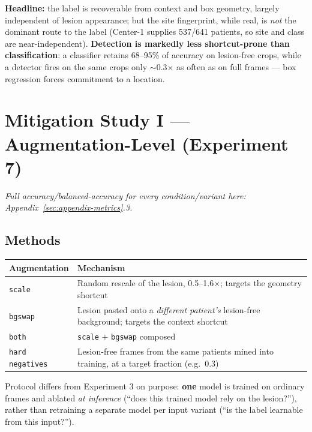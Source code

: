 \documentclass[10pt]{article}
\begin{document}
\textbf{Headline:} the label is recoverable from context and box geometry, largely independent of lesion
appearance; but the site fingerprint, while real, is \emph{not} the dominant route to the label (Center-1
supplies 537/641 patients, so site and class are near-independent). \textbf{Detection is markedly less
shortcut-prone than classification}: a classifier retains 68--95\% of accuracy on lesion-free crops, while a
detector fires on the same crops only $\sim$0.3$\times$ as often as on full frames --- box regression forces
commitment to a location.

\clearpage
\section{Mitigation Study I --- Augmentation-Level (Experiment 7)}
\label{sec:mit1}

\noindent\textit{Full accuracy/balanced-accuracy for every condition/variant here: Appendix~\ref{sec:appendix-metrics}.3.}

\subsection{Methods}

\begin{center}
\begin{tabular}{lL{9.5cm}}
\toprule
\textbf{Augmentation} & \textbf{Mechanism} \\
\midrule
\texttt{scale} & Random rescale of the lesion, 0.5--1.6$\times$; targets the geometry shortcut \\
\texttt{bgswap} & Lesion pasted onto a \emph{different patient's} lesion-free background; targets the context shortcut \\
\texttt{both} & \texttt{scale} + \texttt{bgswap} composed \\
\texttt{hard negatives} & Lesion-free frames from the same patients mined into training, at a target fraction (e.g.\ 0.3) \\
\bottomrule
\end{tabular}
\end{center}

Protocol differs from Experiment 3 on purpose: \textbf{one} model is trained on ordinary frames and ablated
\emph{at inference} (``does this trained model rely on the lesion?''), rather than retraining a separate
model per input variant (``is the label learnable from this input?'').
\end{document}
